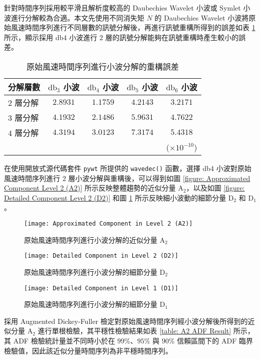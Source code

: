 針對時間序列採用較平滑且解析度較高的 Daubechies Wavelet 小波或 Symlet 小波進行分解較為合適。本文先使用不同消失矩 $N$ 的 Daubechies Wavelet 小波將原始風速時間序列進行不同層數的訊號分解後，再進行訊號重構所得到的誤差如表 \ref{table: Wavelet Reconstruction Error} 所示，顯示採用 db4 小波進行 $2$ 層的訊號分解能夠在訊號重構時產生較小的誤差。

\begin{table}[htbp]
  \centering
  \caption[原始風速時間序列進行小波分解的重構誤差]{原始風速時間序列進行小波分解的重構誤差}
  \begin{tabular}{lcccc}
    \toprule
    \textbf{分解層數} & $\text{db}_3$ \textbf{小波} & $\text{db}_4$ \textbf{小波} & $\text{db}_5$ \textbf{小波} & $\text{db}_6$ \textbf{小波} \\
    \midrule
    $2$ 層分解 & $2.8931$ & $1.1759$ & $4.2143$ & $3.2171$ \\
    $3$ 層分解 & $4.1932$ & $2.1486$ & $5.9631$ & $4.7622$ \\
    $4$ 層分解 & $4.3194$ & $3.0123$ & $7.3174$ & $5.4318$ \\
    \bottomrule
    & & & & ($\times 10^{-10}$)
  \end{tabular}
  \label{table: Wavelet Reconstruction Error}
\end{table}

在使用開放式源代碼套件 \texttt{pywt} 所提供的 \texttt{wavedec()} 函數，選擇 db4 小波對原始風速時間序列進行 $2$ 層小波分解與重構後，可以得到如圖 \ref{figure: Approximated Component Level 2 (A2)} 所示反映整體趨勢的近似分量 $\text{A}_2$，以及如圖 \ref{figure: Detailed Component Level 2 (D2)} 和圖 \ref{figure: Detailed Component Level 1 (D1)} 所示反映細小波動的細節分量 $\text{D}_2$ 和 $\text{D}_1$。

\begin{figure}[hbp]
  \centering
  \texttt{[image: Approximated Component in Level 2 (A2)]}
  \caption{原始風速時間序列進行小波分解的近似分量 $\text{A}_2$}
  \label{figure: Approximated Component Level 2 (A2)}
  \texttt{[image: Detailed Component in Level 2 (D2)]}
  \caption{原始風速時間序列進行小波分解的細節分量 $\text{D}_2$}
  \label{figure: Detailed Component Level 2 (D2)}
  \texttt{[image: Detailed Component in Level 1 (D1)]}
  \caption{原始風速時間序列進行小波分解的細節分量 $\text{D}_1$}
  \label{figure: Detailed Component Level 1 (D1)}
\end{figure}

採用 Augmented Dickey-Fuller 檢定對原始風速時間序列經小波分解後所得到的近似分量 $\text{A}_2$ 進行單根檢驗，其平穩性檢驗結果如表 \ref{table: A2 ADF Result} 所示，其 ADF 檢驗統計量並不同時小於在 $99\%$、$95\%$ 與 $90\%$ 信賴區間下的 ADF 臨界檢驗值，因此該近似分量時間序列為非平穩時間序列。

